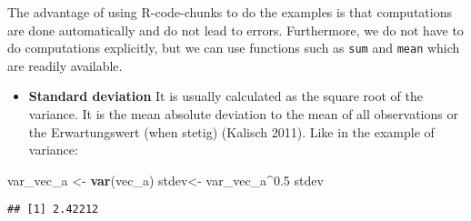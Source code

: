 \documentclass[]{article}
\newenvironment{Shaded}{\begin{snugshade}}{\end{snugshade}}
\newcommand{\KeywordTok}[1]{\textcolor[rgb]{0.13,0.29,0.53}{\textbf{#1}}}
\newcommand{\FloatTok}[1]{\textcolor[rgb]{0.00,0.00,0.81}{#1}}
\newcommand{\StringTok}[1]{\textcolor[rgb]{0.31,0.60,0.02}{#1}}
\newcommand{\OperatorTok}[1]{\textcolor[rgb]{0.81,0.36,0.00}{\textbf{#1}}}
\newcommand{\NormalTok}[1]{#1}
\providecommand{\tightlist}{%
  \setlength{\itemsep}{0pt}\setlength{\parskip}{0pt}}
\begin{document}
The advantage of using R-code-chunks to do the examples is that
computations are done automatically and do not lead to errors.
Furthermore, we do not have to do computations explicitly, but we can
use functions such as \texttt{sum} and \texttt{mean} which are readily
available.

\begin{itemize}
\tightlist
\item
  \textbf{Standard deviation} It is usually calculated as the square
  root of the variance. It is the mean absolute deviation to the mean of
  all observations or the Erwartungswert (when stetig) (Kalisch 2011).
  Like in the example of variance:
\end{itemize}

\begin{Shaded}
\begin{Highlighting}[]
\NormalTok{var_vec_a <-}\StringTok{ }\KeywordTok{var}\NormalTok{(vec_a)}
\NormalTok{stdev<-}\StringTok{ }\NormalTok{var_vec_a}\OperatorTok{^}\FloatTok{0.5}
\NormalTok{stdev}
\end{Highlighting}
\end{Shaded}

\begin{verbatim}
## [1] 2.42212
\end{verbatim}
\end{document}
